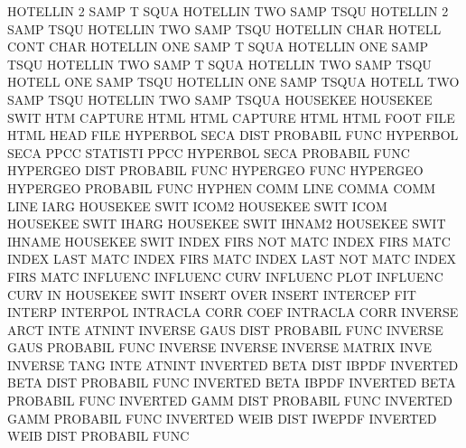 HOTELLIN 2    SAMP T    SQUA            HOTELLIN TWO  SAMP TSQU
HOTELLIN 2    SAMP TSQU                 HOTELLIN TWO  SAMP TSQU
HOTELLIN CHAR                           HOTELL   CONT CHAR
HOTELLIN ONE  SAMP T    SQUA            HOTELLIN ONE  SAMP TSQU
HOTELLIN TWO  SAMP T    SQUA            HOTELLIN TWO  SAMP TSQU
HOTELL   ONE  SAMP TSQU                 HOTELLIN ONE  SAMP TSQUA
HOTELL   TWO  SAMP TSQU                 HOTELLIN TWO  SAMP TSQUA
HOUSEKEE                                HOUSEKEE SWIT
HTM                                     CAPTURE  HTML
HTML                                    CAPTURE  HTML
HTML     FOOT FILE                      HTML     HEAD FILE
HYPERBOL SECA DIST                      PROBABIL FUNC
HYPERBOL SECA PPCC                      STATISTI PPCC
HYPERBOL SECA                           PROBABIL FUNC
HYPERGEO DIST                           PROBABIL FUNC
HYPERGEO FUNC                           HYPERGEO
HYPERGEO                                PROBABIL FUNC
HYPHEN   COMM LINE                      COMMA    COMM LINE
IARG                                    HOUSEKEE SWIT
ICOM2                                   HOUSEKEE SWIT
ICOM                                    HOUSEKEE SWIT
IHARG                                   HOUSEKEE SWIT
IHNAM2                                  HOUSEKEE SWIT
IHNAME                                  HOUSEKEE SWIT
INDEX    FIRS NOT  MATC                 INDEX    FIRS MATC
INDEX    LAST MATC                      INDEX    FIRS MATC
INDEX    LAST NOT  MATC                 INDEX    FIRS MATC
INFLUENC                                INFLUENC CURV
INFLUENC PLOT                           INFLUENC CURV
IN                                      HOUSEKEE SWIT
INSERT   OVER                           INSERT
INTERCEP                                FIT
INTERP                                  INTERPOL
INTRACLA CORR COEF                      INTRACLA CORR
INVERSE  ARCT INTE                      ATNINT
INVERSE  GAUS DIST                      PROBABIL FUNC
INVERSE  GAUS                           PROBABIL FUNC
INVERSE                                 INVERSE
INVERSE                                 MATRIX   INVE
INVERSE  TANG INTE                      ATNINT
INVERTED BETA DIST                      IBPDF
INVERTED BETA DIST                      PROBABIL FUNC
INVERTED BETA                           IBPDF
INVERTED BETA                           PROBABIL FUNC
INVERTED GAMM DIST                      PROBABIL FUNC
INVERTED GAMM                           PROBABIL FUNC
INVERTED WEIB DIST                      IWEPDF
INVERTED WEIB DIST                      PROBABIL FUNC
